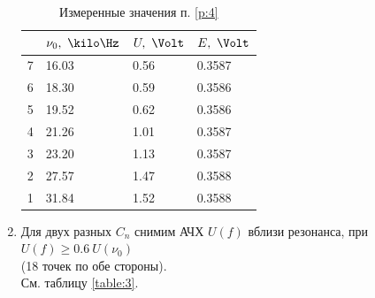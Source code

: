 \documentclass{report}
\begin{document}
\begin{enumerate}
	      \begin{table}[H]
		      \centering
		      \begin{tabular}{l|lll}
			        & $ \nu_0,\ \kilo\Hz $ & $ U,\ \Volt $ & $ E,\ \Volt $ \\
			      \hline
			      7 & 16.03                & 0.56          & 0.3587        \\
			      6 & 18.30                & 0.59          & 0.3586        \\
			      5 & 19.52                & 0.62          & 0.3586        \\
			      4 & 21.26                & 1.01          & 0.3587        \\
			      3 & 23.20                & 1.13          & 0.3587        \\
			      2 & 27.57                & 1.47          & 0.3588        \\
			      1 & 31.84                & 1.52          & 0.3588        \\
		      \end{tabular}
		      \caption{Измеренные значения п. \ref{p:4}}
		      \label{table:2}
	      \end{table}

	\item \label{p:5} Для двух разных $ C_n $ снимим АЧХ $ U(f) $ вблизи резонанса, при
	      $ U(f) \ge 0.6\ U(\nu_0) $ \\(18 точек по обе стороны).\\
	      См. таблицу \ref{table:3}.


\end{enumerate}
\end{document}
